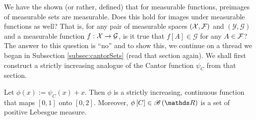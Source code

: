 We have the shown (or rather, defined) that for measurable functions,
preimages of measurable sets are measurable. Does this hold for images
under measurable functions as well? That is, for any pair of measurable
spaces $\left(\mathcal{X},\mathcal{F}\right)$ and $\left(\mathcal{Y},\mathcal{G}\right)$
and a measurable function $f:\mathcal{X}\to\mathcal{G}$, is it true that $f\left[A\right]\in\mathcal{G}$
for any $A\in\mathcal{F}$? The answer to this question is ``no'' and to
show this, we continue on a thread we began in Subsection \ref{subsec:cantorSets}
(read that section again). We shall first construct a strictly increasing
analogue of the Cantor function $\psi_{C}$ from that section.
\begin{prop}
\label{prop:strictlyIncreasingCantorFunction}Let $\phi\left(x\right):=\psi_{C}\left(x\right)+x$.
Then $\phi$ is a strictly increasing, continuous function that maps
$\left[0,1\right]$ onto $\left[0,2\right]$. Moreover, $\phi\left[C\right]\in\borel\left(\R\right)$
is a set of positive Lebesgue measure.
\end{prop}

